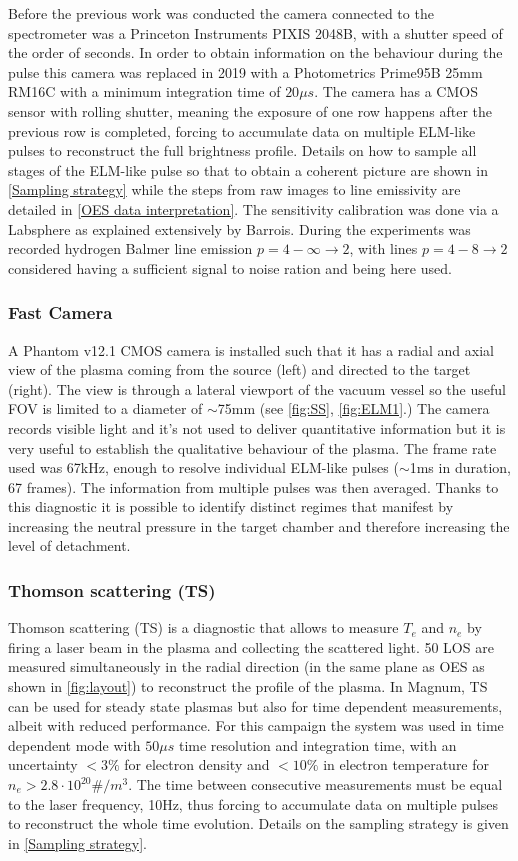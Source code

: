 Before the previous work was conducted the camera connected to the spectrometer was a Princeton Instruments PIXIS 2048B, with a shutter speed of the order of seconds. In order to obtain information on the behaviour during the pulse this camera was replaced in 2019 with a Photometrics Prime95B 25mm RM16C with a minimum integration time of $20\mu s$. The camera has a CMOS sensor with rolling shutter, meaning the exposure of one row happens after the previous row is completed, forcing to accumulate data on multiple ELM-like pulses to reconstruct the full brightness profile. Details on how to sample all stages of the ELM-like pulse so that to obtain a coherent picture are shown in \autoref{Sampling strategy} while the steps from raw images to line emissivity are detailed in \ref{OES data interpretation}. The sensitivity calibration was done via a Labsphere as explained extensively by Barrois. \cite{Science2017} During the experiments was recorded hydrogen Balmer line emission $p=4-\infty \rightarrow 2$, with lines $p=4-8 \rightarrow 2$ considered having a sufficient signal to noise ration and being here used.

\subsubsection{Fast Camera}\label{Fast Camera1}
A Phantom v12.1 CMOS camera is installed such that it has a radial and axial view of the plasma coming from the source (left) and directed to the target (right). The view is through a lateral viewport of the vacuum vessel so the useful FOV is limited to a diameter of $\sim$75mm (see \autoref{fig:SS}, \ref{fig:ELM1}.) The camera records visible light and it’s not used to deliver quantitative information but it is very useful to establish the qualitative behaviour of the plasma. The frame rate used was 67kHz, enough to resolve individual ELM-like pulses ($\sim$1ms in duration, 67 frames). The information from multiple pulses was then averaged. Thanks to this diagnostic it is possible to identify distinct regimes that manifest by increasing the neutral pressure in the target chamber and therefore increasing the level of detachment.
\subsubsection{Thomson scattering (TS)}\label{Thomson scattering1}
Thomson scattering (TS) is a diagnostic that allows to measure $T_e$ and $n_e$ by firing a laser beam in the plasma and collecting the scattered light. 50 LOS are measured simultaneously in the radial direction (in the same plane as OES as shown in \autoref{fig:layout}) to reconstruct the profile of the plasma. In Magnum, TS can be used for steady state plasmas but also for time dependent measurements, albeit with reduced performance. For this campaign the system was used in time dependent mode with $50\mu s$ time resolution and integration time, with an uncertainty $<3\%$ for electron density and $<10\%$ in electron temperature for $n_e>2.8 \cdot 10^{20} \#/m^3$. The time between consecutive measurements must be equal to the laser frequency, 10Hz, thus forcing to accumulate data on multiple pulses to reconstruct the whole time evolution. \cite{VanDerMeiden2012} Details on the sampling strategy is given in \autoref{Sampling strategy}.
